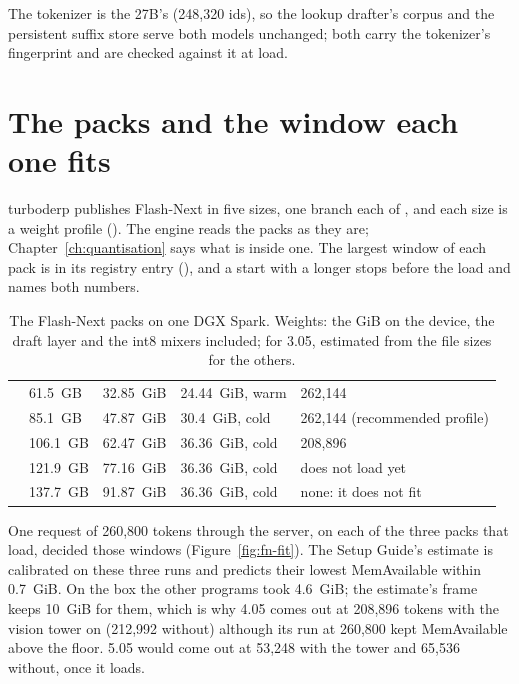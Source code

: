 The tokenizer is the 27B's (248,320 ids), so the lookup drafter's corpus and the persistent suffix store serve both models unchanged; both carry the tokenizer's fingerprint and are checked against it at load.

\section{The packs and the window each one fits}\label{sec:fn-packs}

turboderp publishes Flash-Next in five sizes, one branch each of , and each size is a weight profile (). The engine reads the packs as they are; Chapter~\ref{ch:quantisation} says what is inside one. The largest window of each pack is in its registry entry (), and a start with a longer  stops before the load and names both numbers.

\begin{table}[htbp]
\centering\small
\caption[The Flash-Next packs]{The Flash-Next packs on one DGX Spark. Weights: the GiB on the device, the draft layer and the int8 mixers included; \measured{} for 3.05, estimated from the file sizes for the others.}\label{tab:fn-packs}
\begin{tabularx}{\linewidth}{@{}L{.17\linewidth}L{.1\linewidth}L{.13\linewidth}L{.18\linewidth}Y@{}}
\toprule
{} &  &  &  &  \\
\midrule
{} & 61.5~GB & 32.85~GiB & 24.44~GiB, warm & 262,144 \\
 & 85.1~GB & 47.87~GiB & 30.4~GiB, cold & 262,144 (recommended profile) \\
 & 106.1~GB & 62.47~GiB & 36.36~GiB, cold & 208,896 \\
 & 121.9~GB & 77.16~GiB & 36.36~GiB, cold & does not load yet \\
 & 137.7~GB & 91.87~GiB & 36.36~GiB, cold & none: it does not fit \\
\bottomrule
\end{tabularx}
\end{table}

One request of 260,800 tokens through the server, on each of the three packs that load, decided those windows (Figure~\ref{fig:fn-fit}). The Setup Guide's estimate is calibrated on these three runs and predicts their lowest MemAvailable within 0.7~GiB. On the box the other programs took 4.6~GiB; the estimate's frame keeps 10~GiB for them, which is why 4.05 comes out at 208,896 tokens with the vision tower on (212,992 without) although its run at 260,800 kept MemAvailable above the floor. 5.05 would come out at 53,248 with the tower and 65,536 without, once it loads.

